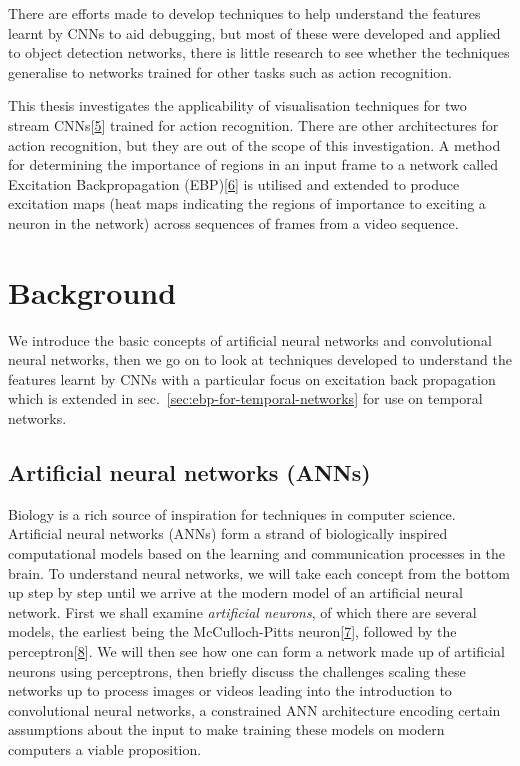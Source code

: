 \documentclass[A4paper,draft]{scrreprt}
\begin{document}
There are efforts made to develop techniques to help understand the
features learnt by CNNs to aid debugging, but most of these were
developed and applied to object detection networks, there is little
research to see whether the techniques generalise to networks trained
for other tasks such as action recognition.

This thesis investigates the applicability of visualisation techniques
for two stream
CNNs{[}\protect\hyperlink{ref-simonyan2014_TwoStreamConvolutionalNetworks}{5}{]}
trained for action recognition. There are other architectures for action
recognition, but they are out of the scope of this investigation. A
method for determining the importance of regions in an input frame to a
network called Excitation Backpropagation
(EBP){[}\protect\hyperlink{ref-zhang2016_TopdownNeuralAttention}{6}{]}
is utilised and extended to produce excitation maps (heat maps
indicating the regions of importance to exciting a neuron in the
network) across sequences of frames from a video sequence.

\chapter{Background}\label{sec:background}

We introduce the basic concepts of artificial neural networks and
convolutional neural networks, then we go on to look at techniques
developed to understand the features learnt by CNNs with a particular
focus on excitation back propagation which is extended in
sec.~\ref{sec:ebp-for-temporal-networks} for use on temporal networks.

\section{Artificial neural networks (ANNs)}\label{sec:background:ann}

Biology is a rich source of inspiration for techniques in computer
science. Artificial neural networks (ANNs) form a strand of biologically
inspired computational models based on the learning and communication
processes in the brain. To understand neural networks, we will take each
concept from the bottom up step by step until we arrive at the modern
model of an artificial neural network. First we shall examine
\emph{artificial neurons}, of which there are several models, the
earliest being the McCulloch-Pitts
neuron{[}\protect\hyperlink{ref-mcculloch1943_logicalcalculusideas}{7}{]},
followed by the
perceptron{[}\protect\hyperlink{ref-rosenblatt1957_Perceptronperceivingrecognising}{8}{]}.
We will then see how one can form a network made up of artificial
neurons using perceptrons, then briefly discuss the challenges scaling
these networks up to process images or videos leading into the
introduction to convolutional neural networks, a constrained ANN
architecture encoding certain assumptions about the input to make
training these models on modern computers a viable proposition.
\end{document}
